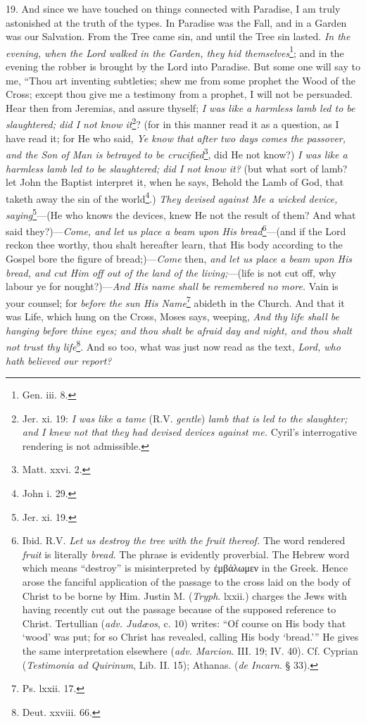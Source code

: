 19. And since we have touched on things connected with Paradise, I am truly astonished at the truth of the types. In Paradise was the Fall, and in a Garden was our Salvation. From the Tree came sin, and until the Tree sin lasted. \emph{In the evening, when the Lord walked in the Garden, they hid themselves}\footnote{Gen. iii. 8.}; and in the evening the robber is brought by the Lord into Paradise. But some one will say to me, “Thou art inventing subtleties; shew me from some prophet the Wood of the Cross; except thou give me a testimony from a prophet, I will not be persuaded. Hear then from Jeremias, and assure thyself; \emph{I was like a harmless lamb led to be slaughtered; did I not know it}\footnote{Jer. xi. 19: \emph{I was like a tame} (R.V. \emph{gentle}) \emph{lamb that is led to the slaughter; and I knew not that they had devised devices against me.} Cyril’s interrogative rendering is not admissible.}? (for in this manner read it as a question, as I have read it; for He who said, \emph{Ye know that after two days comes the passover, and the Son of Man is betrayed to be crucified}\footnote{Matt. xxvi. 2.}, did He not know?) \emph{I was like a harmless lamb led to be slaughtered; did I not know it?} (but what sort of lamb? let John the Baptist interpret it, when he says, Behold the Lamb of God, that taketh away the sin of the world\footnote{John i. 29.}.) \emph{They devised against Me a wicked device, saying}\footnote{Jer. xi. 19.}—(He who knows the devices, knew He not the result of them? And what said they?)—\emph{Come, and let us place a beam upon His bread}\footnote{Ibid. R.V. \emph{Let us destroy the tree with the fruit thereof.} The word rendered \emph{fruit} is literally \emph{bread}. The phrase is evidently proverbial. The Hebrew word which means “destroy” is misinterpreted by \textgreek{ἐμβάλωμεν} in the Greek. Hence arose the fanciful application of the passage to the cross laid on the body of Christ to be borne by Him. Justin M. (\emph{Tryph}. lxxii.) charges the Jews with having recently cut out the passage because of the supposed reference to Christ. Tertullian (\emph{adv. Judæos}, c. 10) writes: “Of course on His body that ‘wood’ was put; for so Christ has revealed, calling His body ‘bread.’” He gives the same interpretation elsewhere (\emph{adv. Marcion}. III. 19; IV. 40). Cf. Cyprian (\emph{Testimonia ad Quirinum}, Lib. II. 15); Athanas. (\emph{de Incarn}. § 33).}—(and if the Lord reckon thee worthy, thou shalt hereafter learn, that His body according to the Gospel bore the figure of bread;)—\emph{Come} then, \emph{and let us place a beam upon His bread, and cut Him off out of the land of the living;}—(life is not cut off, why labour ye for nought?)—\emph{And His name shall be remembered no more.} Vain is your counsel; for \emph{before the sun His Name}\footnote{Ps. lxxii. 17.} abideth in the Church. And that it was Life, which hung on the Cross, Moses says, weeping, \emph{And thy life shall be hanging before thine eyes; and thou shalt be afraid day and night, and thou shalt not trust thy life}\footnote{Deut. xxviii. 66.}. And so too, what was just now read as the text, \emph{Lord, who hath believed our report?}

